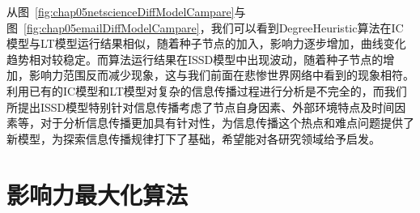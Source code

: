 %
从图~\ref{fig:chap05netscienceDiffModelCampare}与图~\ref{fig:chap05emailDiffModelCampare}，我们可以看到DegreeHeuristic算法在IC模型与LT模型运行结果相似，随着种子节点的加入，影响力逐步增加，曲线变化趋势相对较稳定。而算法运行结果在ISSD模型中出现波动，随着种子节点的增加，影响力范围反而减少现象，这与我们前面在悲惨世界网络中看到的现象相符。利用已有的IC模型和LT模型对复杂的信息传播过程进行分析是不完全的，而我们所提出ISSD模型特别针对信息传播考虑了节点自身因素、外部环境特点及时间因素等，对于分析信息传播更加具有针对性，为信息传播这个热点和难点问题提供了新模型，为探索信息传播规律打下了基础，希望能对各研究领域给予启发。

\section{影响力最大化算法}

